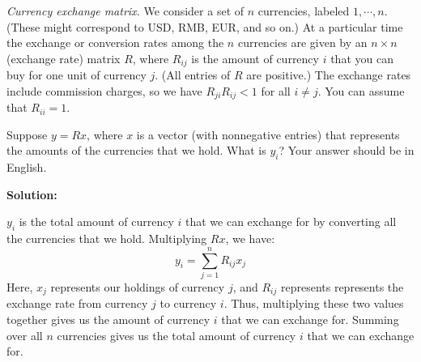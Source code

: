 \textit{Currency exchange matrix.} We consider a set of $n$ currencies, labeled
$1, \cdots, n$. (These might correspond to USD, RMB, EUR, and so on.) At a
particular time the exchange or conversion rates among the $n$ currencies are
given by an $n \times n$ (exchange rate) matrix $R$, where $R_{ij}$ is the
amount of currency $i$ that you can buy for one unit of currency $j$. (All
entries of $R$ are positive.) The exchange rates include commission charges, so
we have $R_{ji}R_{ij} < 1$ for all $i \neq j$. You can assume that $R_{ii} = 1$.

\par Suppose $y = Rx$, where $x$ is a vector (with nonnegative entries) that
represents the amounts of the currencies that we hold. What is $y_i$? Your
answer should be in English.

\par \textbf{Solution:}
\par $y_i$ is the total amount of currency $i$ that we can exchange for by converting
all the currencies that we hold. Multiplying $Rx$, we have:
$$ y_i = \sum_{j=1}^n R_{ij}x_j $$
Here, $x_j$ represents our holdings of currency $j$, and $R_{ij}$ represents
represents the exchange rate from currency $j$ to currency $i$. Thus,
multiplying these two values together gives us the amount of currency $i$ that
we can exchange for. Summing over all $n$ currencies gives us the total amount
of currency $i$ that we can exchange for.
